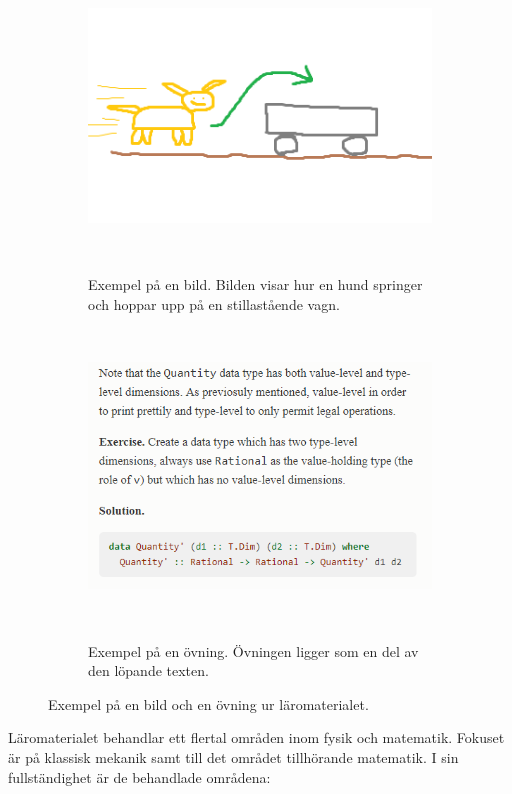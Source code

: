 \begin{figure}[tph]
    \centering
    \begin{subfigure}[t]{0.5\textwidth}
        \centering
        \includegraphics[width=0.9\linewidth]{figure/smakprov_bild_laromaterial.png}
        \caption{Exempel på en bild. Bilden visar hur en hund springer och
                 hoppar upp på en stillastående
                 vagn.}~\label{fig:smakprov_bild_laromaterial}
    \end{subfigure}%
    ~~~
    \begin{subfigure}[t]{0.5\textwidth}
        \centering
        \includegraphics[width=0.9\linewidth]{figure/smakprov_ovning.png}
        \caption{Exempel på en övning. Övningen ligger som en del av den
                 löpande texten.}~\label{fig:smakprov_ovning}
    \end{subfigure}
    \caption{Exempel på en bild och en övning ur läromaterialet.} 
\end{figure}

Läromaterialet behandlar ett flertal områden inom fysik och matematik.
Fokuset är på klassisk mekanik samt till det området tillhörande matematik. I
sin fullständighet är de behandlade områdena:

